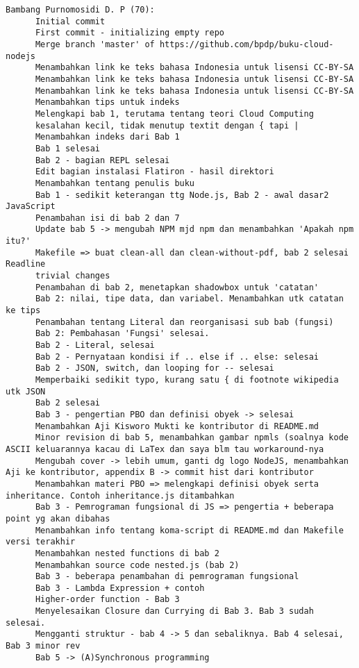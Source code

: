 \begin{lstlisting}
Bambang Purnomosidi D. P (70):
      Initial commit
      First commit - initializing empty repo
      Merge branch 'master' of https://github.com/bpdp/buku-cloud-nodejs
      Menambahkan link ke teks bahasa Indonesia untuk lisensi CC-BY-SA
      Menambahkan link ke teks bahasa Indonesia untuk lisensi CC-BY-SA
      Menambahkan link ke teks bahasa Indonesia untuk lisensi CC-BY-SA
      Menambahkan tips untuk indeks
      Melengkapi bab 1, terutama tentang teori Cloud Computing
      kesalahan kecil, tidak menutup textit dengan { tapi |
      Menambahkan indeks dari Bab 1
      Bab 1 selesai
      Bab 2 - bagian REPL selesai
      Edit bagian instalasi Flatiron - hasil direktori
      Menambahkan tentang penulis buku
      Bab 1 - sedikit keterangan ttg Node.js, Bab 2 - awal dasar2 JavaScript
      Penambahan isi di bab 2 dan 7
      Update bab 5 -> mengubah NPM mjd npm dan menambahkan 'Apakah npm itu?'
      Makefile => buat clean-all dan clean-without-pdf, bab 2 selesai Readline
      trivial changes
      Penambahan di bab 2, menetapkan shadowbox untuk 'catatan'
      Bab 2: nilai, tipe data, dan variabel. Menambahkan utk catatan ke tips
      Penambahan tentang Literal dan reorganisasi sub bab (fungsi)
      Bab 2: Pembahasan 'Fungsi' selesai.
      Bab 2 - Literal, selesai
      Bab 2 - Pernyataan kondisi if .. else if .. else: selesai
      Bab 2 - JSON, switch, dan looping for -- selesai
      Memperbaiki sedikit typo, kurang satu { di footnote wikipedia utk JSON
      Bab 2 selesai
      Bab 3 - pengertian PBO dan definisi obyek -> selesai
      Menambahkan Aji Kisworo Mukti ke kontributor di README.md
      Minor revision di bab 5, menambahkan gambar npmls (soalnya kode ASCII keluarannya kacau di LaTex dan saya blm tau workaround-nya
      Mengubah cover -> lebih umum, ganti dg logo NodeJS, menambahkan Aji ke kontributor, appendix B -> commit hist dari kontributor
      Menambahkan materi PBO => melengkapi definisi obyek serta inheritance. Contoh inheritance.js ditambahkan
      Bab 3 - Pemrograman fungsional di JS => pengertia + beberapa point yg akan dibahas
      Menambahkan info tentang koma-script di README.md dan Makefile versi terakhir
      Menambahkan nested functions di bab 2
      Menambahkan source code nested.js (bab 2)
      Bab 3 - beberapa penambahan di pemrograman fungsional
      Bab 3 - Lambda Expression + contoh
      Higher-order function - Bab 3
      Menyelesaikan Closure dan Currying di Bab 3. Bab 3 sudah selesai.
      Mengganti struktur - bab 4 -> 5 dan sebaliknya. Bab 4 selesai, Bab 3 minor rev
      Bab 5 -> (A)Synchronous programming

\end{lstlisting}
